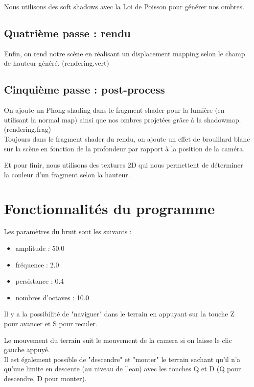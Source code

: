 \documentclass{article}
\begin{document}
Nous utilisons des soft shadows avec la Loi de Poisson pour générer nos ombres.\\

\subsection*{Quatrième passe : rendu}
Enfin, on rend notre scène en réalisant un displacement mapping selon le champ de hauteur généré. (rendering.vert)

\subsection*{Cinquième passe : post-process}

On ajoute un Phong shading dans le fragment shader pour la lumière (en utilisant la normal map) ainsi que nos ombres projetées grâce à la shadowmap. (rendering.frag)\\

Toujours dans le fragment shader du rendu, on ajoute un effet de brouillard blanc sur la scène en fonction de la profondeur par rapport à la position de la caméra.

Et pour finir, nous utilisons des textures 2D qui nous permettent de déterminer la couleur d'un fragment selon la hauteur.

\section{Fonctionnalités du programme}

Les paramètres du bruit sont les suivants :
\begin{itemize}
	\item amplitude : 50.0
	\item fréquence : 2.0
	\item persistance : 0.4
	\item nombres d'octaves : 10.0
\end{itemize}

Il y a la possibilité de "naviguer" dans le terrain en appuyant sur la touche Z pour avancer et S pour reculer.

Le mouvement du terrain suit le mouvement de la camera si on laisse le clic gauche appuyé.\\

Il est également possible de "descendre" et "monter" le terrain sachant qu'il n'a qu'une limite en descente (au niveau de l'eau) avec les touches Q et D (Q pour descendre, D pour monter).\\
\end{document}
